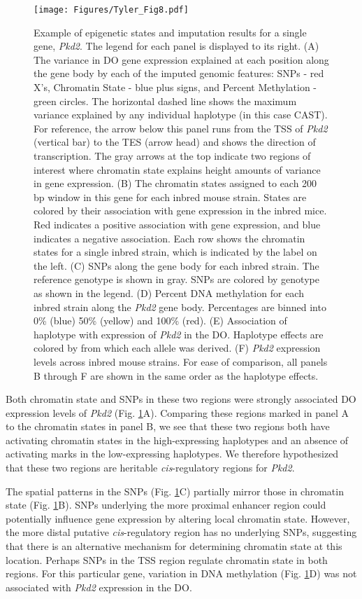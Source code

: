 \documentclass[
  11pt,
]{article}
\begin{document}
\begin{figure}[ht!]
\texttt{[image: Figures/Tyler\_Fig8.pdf]} 
\caption{Example of epigenetic states and imputation results for a single 
gene, \textit{Pkd2}. The legend for each panel is displayed to its right.
(A) The variance in DO gene expression explained at 
each position along the gene body by each of the imputed genomic 
features: SNPs - red X's, Chromatin State - blue plus signs, and 
Percent Methylation - green circles. The horizontal 
dashed line shows the maximum variance explained by any individual 
haplotype (in this case CAST). For reference, the arrow below 
this panel runs from the TSS of \textit{Pkd2} (vertical bar) to the 
TES (arrow head) and shows the direction of transcription. The 
gray arrows at the top indicate two regions of interest where 
chromatin state explains height amounts of variance in gene expression. 
(B) The chromatin states assigned to each 200 bp window in this gene 
for each inbred mouse strain. States are colored by their association 
with gene expression in the inbred mice. Red indicates a positive 
association with gene expression, and blue indicates a negative 
association. Each row shows the chromatin states for a single inbred 
strain, which is indicated by the label on the left. (C) SNPs along 
the gene body for each inbred strain. The reference genotype is shown 
in gray. SNPs are colored by genotype as shown in the legend. (D) Percent 
DNA methylation for each inbred strain along the \textit{Pkd2} gene body. 
Percentages are binned into 0\% (blue) 50\% (yellow) and 100\% (red). (E) 
Association of haplotype with expression of \textit{Pkd2} in the DO. Haplotype 
effects are colored by from which each allele was derived. (F) \textit{Pkd2} 
expression levels across inbred mouse strains. For ease of comparison, 
all panels B through F are shown in the same order as the haplotype effects.}
\label{fig:example_gene}
\end{figure}

Both chromatin state and SNPs in these two regions were strongly
associated DO expression levels of \textit{Pkd2} (Fig.
\ref{fig:example_gene}A). Comparing these regions marked in panel A to
the chromatin states in panel B, we see that these two regions both have
activating chromatin states in the high-expressing haplotypes and an
absence of activating marks in the low-expressing haplotypes. We
therefore hypothesized that these two regions are heritable
\textit{cis}-regulatory regions for \textit{Pkd2}.

The spatial patterns in the SNPs (Fig. \ref{fig:example_gene}C)
partially mirror those in chromatin state (Fig.
\ref{fig:example_gene}B). SNPs underlying the more proximal enhancer
region could potentially influence gene expression by altering local
chromatin state. However, the more distal putative
\textit{cis}-regulatory region has no underlying SNPs, suggesting that
there is an alternative mechanism for determining chromatin state at
this location. Perhaps SNPs in the TSS region regulate chromatin state
in both regions. For this particular gene, variation in DNA methylation
(Fig. \ref{fig:example_gene}D) was not associated with \textit{Pkd2}
expression in the DO.
\end{document}
